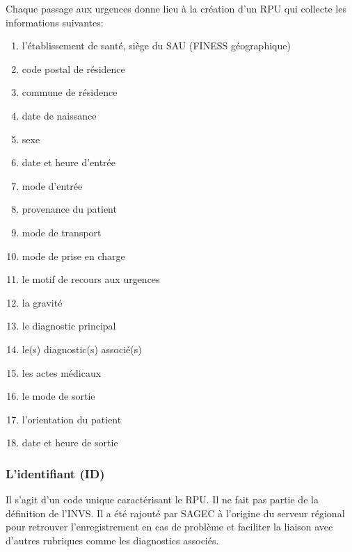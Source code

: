 \documentclass[12pt,english,french,twoside]{book}\usepackage[]{graphicx}\usepackage[]{color}
\begin{document}
Chaque passage aux urgences donne lieu à la création d'un RPU qui collecte les informations suivantes:
\begin{enumerate}
  \item l'établissement de santé, siège du SAU (FINESS géographique)
  \item code postal de résidence
  \item commune de résidence
  \item date de naissance
  \item sexe
  \item date et heure d'entrée
  \item mode d'entrée
  \item provenance du patient
  \item mode de transport
  \item mode de prise en charge
  \item le motif de recours aux urgences
  \item la gravité
  \item le diagnostic principal
  \item le(s) diagnostic(s) associé(s)
  \item les actes médicaux
  \item le mode de sortie
  \item l'orientation du patient
  \item date et heure de sortie
\end{enumerate}

\subsubsection{L'identifiant (ID)}

Il s'agit d'un code unique caractérisant le RPU. Il ne fait pas partie de la définition de l'INVS. 
Il a été rajouté par SAGEC à l'origine du serveur régional pour retrouver l'enregistrement en cas de problème et faciliter la liaison avec d'autres rubriques comme les diagnostics associés.
\end{document}

